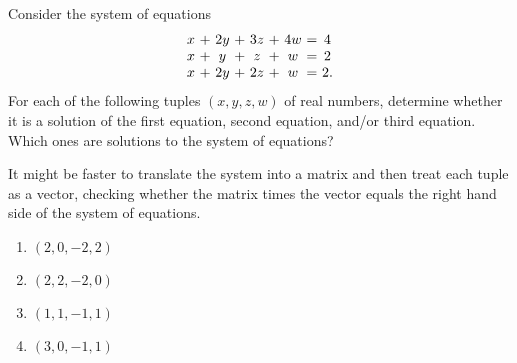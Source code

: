 \documentclass{ximera}
\author{Zack Reed}
\begin{document}
\begin{exercise}

    Consider the system of equations
    \begin{equation*}
      \begin{array}{c@{~}c@{~}c@{~}c@{~}c@{~}c@{~}c@{~}c@{~}c}
        x&+&2y&+&3z&+&4w &=& 4 \\
        x&+&y&+&z&+&w &=& 2 \\
        x&+&2y&+&2z&+&w &=& 2.
      \end{array}
    \end{equation*}
    For each of the following tuples $(x,y,z,w)$ of real numbers,
    determine whether it is a solution of the first equation, second
    equation, and/or third equation. Which ones are solutions to the
    system of equations?
  
    \begin{hint}
  
      It might be faster to translate the system into a matrix and then treat each tuple as a vector, checking whether the matrix times the vector equals the right hand side of the system of equations.
  
    \end{hint}
  
    \begin{enumerate}
        \item $(2,0,-2,2)$
        \begin{selectAll}
        \end{selectAll}
      
        \item $(2,2,-2,0)$
        \begin{selectAll}
        \end{selectAll}
      
        \item $(1,1,-1,1)$
        \begin{selectAll}
        \end{selectAll}
      
        \item $(3,0,-1,1)$
        \begin{selectAll}
        \end{selectAll}
      

\end{enumerate}
\end{exercise}
\end{document}
